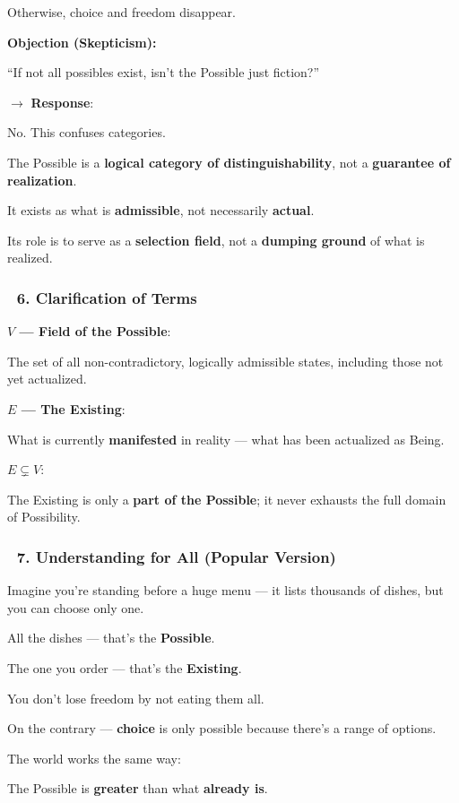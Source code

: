 \documentclass[12pt]{article}
\begin{document}
Otherwise, choice and freedom disappear.

\bigskip

\textbf{Objection (Skepticism):}

``If not all possibles exist, isn’t the Possible just fiction?''

$\rightarrow$ \textbf{Response}:

No. This confuses categories.

The Possible is a \textbf{logical category of distinguishability}, not a \textbf{guarantee of realization}.

It exists as what is \textbf{admissible}, not necessarily \textbf{actual}.

Its role is to serve as a \textbf{selection field}, not a \textbf{dumping ground} of what is realized.

\subsubsection*{🔹 6. Clarification of Terms}
\textbf{$V$ — Field of the Possible}:

The set of all non-contradictory, logically admissible states, including those not yet actualized.

\textbf{$E$ — The Existing}:

What is currently \textbf{manifested} in reality — what has been actualized as Being.

\textbf{$E \subsetneq V$}:

The Existing is only a \textbf{part of the Possible}; it never exhausts the full domain of Possibility.

\subsubsection*{🔹 7. Understanding for All (Popular Version)}
Imagine you’re standing before a huge menu — it lists thousands of dishes, but you can choose only one.

All the dishes — that’s the \textbf{Possible}.

The one you order — that’s the \textbf{Existing}.

You don’t lose freedom by not eating them all.

On the contrary — \textbf{choice} is only possible because there’s a range of options.

The world works the same way:

The Possible is \textbf{greater} than what \textbf{already is}.
\end{document}
